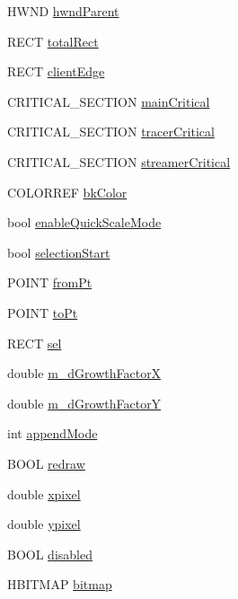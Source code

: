 \begin{DoxyCompactItemize}
\item 
H\-W\-N\-D \hyperlink{class_x_y_plot_a8421da7d70fcc3b4a6844cf9cdbeeff6}{hwnd\-Parent}
\item 
R\-E\-C\-T \hyperlink{class_x_y_plot_a1dcef0bb2b4cd2dc20bedbf4d1304e80}{total\-Rect}
\item 
R\-E\-C\-T \hyperlink{class_x_y_plot_aa0eac633d6785d570c35905d004e371f}{client\-Edge}
\item 
C\-R\-I\-T\-I\-C\-A\-L\-\_\-\-S\-E\-C\-T\-I\-O\-N \hyperlink{class_x_y_plot_aba2d84ca838032f1076d19d5c5570ad2}{main\-Critical}
\item 
C\-R\-I\-T\-I\-C\-A\-L\-\_\-\-S\-E\-C\-T\-I\-O\-N \hyperlink{class_x_y_plot_a8fd6c272f57a472a9c21a6d19ed21f7f}{tracer\-Critical}
\item 
C\-R\-I\-T\-I\-C\-A\-L\-\_\-\-S\-E\-C\-T\-I\-O\-N \hyperlink{class_x_y_plot_ae2f69590c458b38c6f022fd10ca93f35}{streamer\-Critical}
\item 
C\-O\-L\-O\-R\-R\-E\-F \hyperlink{class_x_y_plot_a42d59fb72c1aeadb3111f70f41a7557f}{bk\-Color}
\item 
bool \hyperlink{class_x_y_plot_a0ab2cd0d431b276da5c4f89a0804d4b1}{enable\-Quick\-Scale\-Mode}
\item 
bool \hyperlink{class_x_y_plot_a9bd2edaa45a2559c1b95e7416d4c88b8}{selection\-Start}
\item 
P\-O\-I\-N\-T \hyperlink{class_x_y_plot_a5b1fe941b4ec59db138b4b07dca1eb9f}{from\-Pt}
\item 
P\-O\-I\-N\-T \hyperlink{class_x_y_plot_a8d036a0039ee0ef215f0861a90203898}{to\-Pt}
\item 
R\-E\-C\-T \hyperlink{class_x_y_plot_a56f8019682bc1459751683077f758071}{sel}
\item 
double \hyperlink{class_x_y_plot_a57c26b34917c75f6af03efa78a408482}{m\-\_\-d\-Growth\-Factor\-X}
\item 
double \hyperlink{class_x_y_plot_afe964a24164cef9e95856d91e0dac8e8}{m\-\_\-d\-Growth\-Factor\-Y}
\item 
int \hyperlink{class_x_y_plot_a8dbfcf8d7e52d2180682f3accf711047}{append\-Mode}
\item 
B\-O\-O\-L \hyperlink{class_x_y_plot_ad73c4a652c950f36a9544c6682a0c35e}{redraw}
\item 
double \hyperlink{class_x_y_plot_a13ec1f572335e06c52ebe3f0d9e2e49e}{xpixel}
\item 
double \hyperlink{class_x_y_plot_a51fc0a1063b00947128c0b899f4bb9be}{ypixel}
\item 
B\-O\-O\-L \hyperlink{class_x_y_plot_ae56b7b0eb794ffd0ba288822bcd440f3}{disabled}
\item 
H\-B\-I\-T\-M\-A\-P \hyperlink{class_x_y_plot_a16e9fda87443ee3a531c739a12f8cdab}{bitmap}
\end{DoxyCompactItemize}



